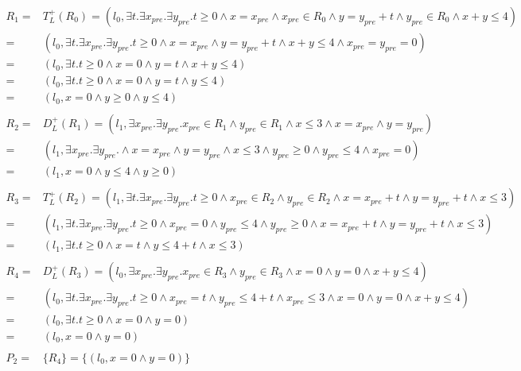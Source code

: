
\begin{align*}
R_1 = & T_L^+(R_0) = (l_0, \exists t. \exists x_{pre}. \exists y_{pre}. t\ge 0 \wedge x = x_{pre} \wedge x_{pre}\in R_0 \wedge y = y_{pre} + t \wedge y_{pre}\in R_0 \wedge x+y\le 4) \\
= & (l_0, \exists t. \exists x_{pre}. \exists y_{pre}. t\ge 0 \wedge x = x_{pre} \wedge y = y_{pre} + t \wedge x+y\le 4 \wedge x_{pre} = y_{pre} = 0)\\
= & (l_0, \exists t. t\ge 0 \wedge x = 0 \wedge y = t \wedge x+y\le 4)\\
= & (l_0, \exists t. t\ge 0 \wedge x = 0 \wedge y = t \wedge y\le 4)\\
= & (l_0, x = 0 \wedge y \ge 0 \wedge y\le 4)\\\\
R_2 = & D_L^+(R_1) = (l_1, \exists x_{pre}. \exists y_{pre}. x_{pre}\in R_1 \wedge y_{pre}\in R_1 \wedge x\le 3 \wedge x=x_{pre}\wedge y=y_{pre})\\
= & (l_1, \exists x_{pre}. \exists y_{pre}. \wedge x=x_{pre} \wedge y = y_{pre} \wedge x \le 3 \wedge y_{pre} \ge 0 \wedge y_{pre} \le 4 \wedge x_{pre} = 0)\\
= & (l_1, x=0 \wedge y \le 4 \wedge y \ge 0)\\\\
R_3 = & T_L^+(R_2) = (l_1, \exists t. \exists x_{pre}. \exists y_{pre}. t\ge 0 \wedge x_{pre} \in R_2 \wedge y_{pre} \in R_2 \wedge x = x_{pre} + t \wedge y = y_{pre} + t \wedge x\le 3)\\
= & (l_1, \exists t. \exists x_{pre}. \exists y_{pre}. t\ge 0 \wedge x_{pre} = 0 \wedge y_{pre} \le 4  \wedge y_{pre} \ge 0\wedge x = x_{pre} + t \wedge y = y_{pre} + t \wedge x\le 3)\\
= & (l_1, \exists t. t\ge 0 \wedge x = t \wedge y \le 4 + t \wedge x\le 3)\\\\
R_4 = & D_L^+(R_3) = (l_0, \exists x_{pre}. \exists y_{pre}. x_{pre} \in R_3 \wedge y_{pre} \in R_3 \wedge x=0 \wedge y=0 \wedge x+y\le 4)\\
= & (l_0, \exists t. \exists x_{pre}. \exists y_{pre}. t \ge 0 \wedge x_{pre} = t \wedge y_{pre} \le 4 +t\wedge x_{pre}\le 3  \wedge x=0 \wedge y=0 \wedge x+y\le 4)\\
= & (l_0, \exists t. t \ge 0 \wedge x=0 \wedge y=0)\\
= & (l_0, x=0 \wedge y=0)\\\\
P_2 = & \{R_4\}= \{(l_0, x=0 \wedge y=0)\}
\end{align*}